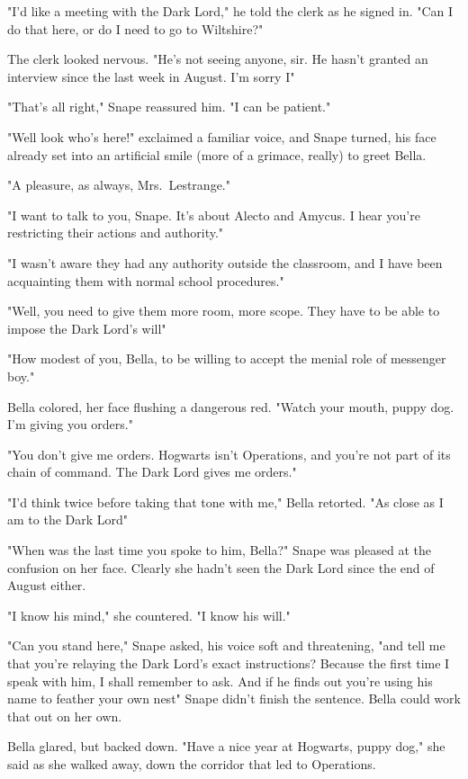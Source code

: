 "I'd like a meeting with the Dark Lord," he told the clerk as he signed in. "Can I do that here, or do I need to go to Wiltshire?"

The clerk looked nervous. "He's not seeing anyone, sir. He hasn't granted an interview since the last week in August. I'm sorry{\el} I{\el}"

"That's all right," Snape reassured him. "I can be patient."

"Well look who's here!" exclaimed a familiar voice, and Snape turned, his face already set into an artificial smile (more of a grimace, really) to greet Bella.

"A pleasure, as always, Mrs.~Lestrange."

"I want to talk to you, Snape. It's about Alecto and Amycus. I hear you're restricting their actions and authority."

"I wasn't aware they had any authority outside the classroom, and I have been acquainting them with normal school procedures."

"Well, you need to give them more room, more scope. They have to be able to impose the Dark Lord's will{\el}"

"How modest of you, Bella, to be willing to accept the menial role of messenger boy."

Bella colored, her face flushing a dangerous red. "Watch your mouth, puppy dog. I'm giving you orders."

"You don't give me orders. Hogwarts isn't Operations, and you're not part of its chain of command. The Dark Lord gives me orders."

"I'd think twice before taking that tone with me," Bella retorted. "As close as I am to the Dark Lord{\el}"

"When was the last time you spoke to him, Bella?" Snape was pleased at the confusion on her face. Clearly she hadn't seen the Dark Lord since the end of August either.

"I know his mind," she countered. "I know his will."

"Can you stand here," Snape asked, his voice soft and threatening, "and tell me that you're relaying the Dark Lord's exact instructions? Because the first time I speak with him, I shall remember to ask. And if he finds out you're using his name to feather your own nest{\el}" Snape didn't finish the sentence. Bella could work that out on her own.

Bella glared, but backed down. "Have a nice year at Hogwarts, puppy dog," she said as she walked away, down the corridor that led to Operations.

